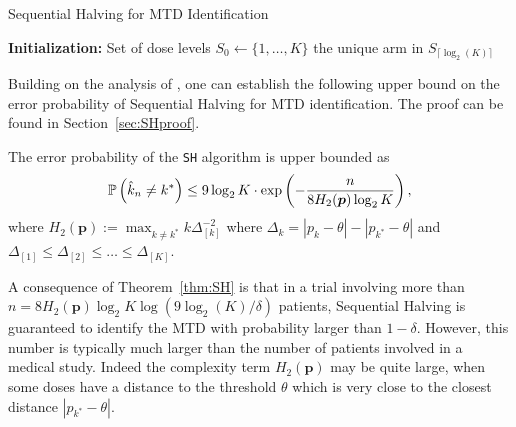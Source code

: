 \begin{algorithm}[H]
\caption{Sequential Halving for MTD Identification}
\label{alg-ST}
\textbf{Initialization:} Set of dose levels $S_0 \leftarrow \{1, \dots, K\}$ \;
\Return the unique arm in  $S_{\lceil{\log_2(K)}\rceil}$ \;
\end{algorithm}


Building on the analysis of \cite{icml2013_karnin13}, one can establish the following upper bound on the error probability of Sequential Halving for MTD identification. The proof can be found in Section~\ref{sec:SHproof}. 

\begin{theorem}\label{thm:SH}
The error probability of the \texttt{SH} algorithm is upper bounded as 
\begin{align*}
  \mathbb{P}\left(\hat{k}_n \neq k^*\right) \leq 9 \log_2 K \cdot \exp \left(
  - \frac{n}{8 H_2 (\bm p)\log_2 K}
  \right),
\end{align*}
where $H_2(\bm p):= \max_{k \ne k^*} {k}{\Delta_{[k]}^{-2}}$ where $\Delta_k = |p_k - \theta| - |p_{k^*} - \theta|$ and $\Delta_{[1]} \leq \Delta_{[2]} \leq \dots \leq \Delta_{[K]}$.
\end{theorem}
A consequence of Theorem~\ref{thm:SH} is that in a trial involving more than $n = 8 H_2(\bm p) \log_2 K\log\left(9\log_2(K)/\delta\right)$ patients, Sequential Halving is guaranteed to identify the MTD with probability larger than $1-\delta$. However, this number is typically much larger than the number of patients involved in a medical study. Indeed the complexity term $H_2(\bm p)$ may be quite large, when some doses have a distance to the threshold $\theta$ which is very close to the closest distance $|p_{k^*} - \theta|$. 

